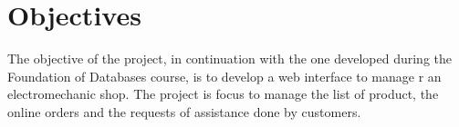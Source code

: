 \section{Objectives}


The objective of the project, in continuation with the one developed during the Foundation of
Databases course, is to develop a web interface to manage r an electromechanic shop. The project is focus to manage the list of product, the online orders and the requests of assistance done by customers.